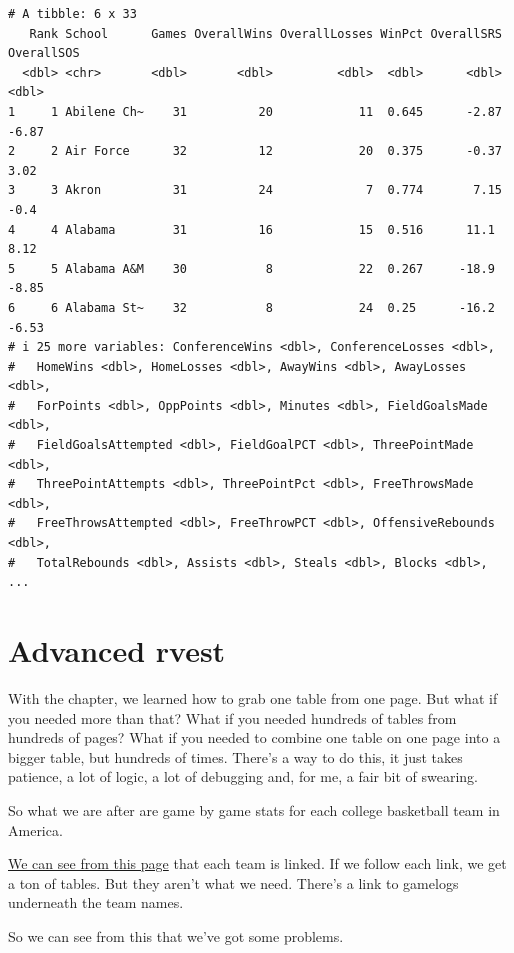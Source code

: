 \documentclass[
  letterpaper,
  DIV=11,
  numbers=noendperiod]{scrreprt}
\begin{document}
\begin{verbatim}
# A tibble: 6 x 33
   Rank School      Games OverallWins OverallLosses WinPct OverallSRS OverallSOS
  <dbl> <chr>       <dbl>       <dbl>         <dbl>  <dbl>      <dbl>      <dbl>
1     1 Abilene Ch~    31          20            11  0.645      -2.87      -6.87
2     2 Air Force      32          12            20  0.375      -0.37       3.02
3     3 Akron          31          24             7  0.774       7.15      -0.4 
4     4 Alabama        31          16            15  0.516      11.1        8.12
5     5 Alabama A&M    30           8            22  0.267     -18.9       -8.85
6     6 Alabama St~    32           8            24  0.25      -16.2       -6.53
# i 25 more variables: ConferenceWins <dbl>, ConferenceLosses <dbl>,
#   HomeWins <dbl>, HomeLosses <dbl>, AwayWins <dbl>, AwayLosses <dbl>,
#   ForPoints <dbl>, OppPoints <dbl>, Minutes <dbl>, FieldGoalsMade <dbl>,
#   FieldGoalsAttempted <dbl>, FieldGoalPCT <dbl>, ThreePointMade <dbl>,
#   ThreePointAttempts <dbl>, ThreePointPct <dbl>, FreeThrowsMade <dbl>,
#   FreeThrowsAttempted <dbl>, FreeThrowPCT <dbl>, OffensiveRebounds <dbl>,
#   TotalRebounds <dbl>, Assists <dbl>, Steals <dbl>, Blocks <dbl>, ...
\end{verbatim}


\hypertarget{advanced-rvest}{%
\chapter{Advanced rvest}\label{advanced-rvest}}

With the chapter, we learned how to grab one table from one page. But
what if you needed more than that? What if you needed hundreds of tables
from hundreds of pages? What if you needed to combine one table on one
page into a bigger table, but hundreds of times. There's a way to do
this, it just takes patience, a lot of logic, a lot of debugging and,
for me, a fair bit of swearing.

So what we are after are game by game stats for each college basketball
team in America.

\href{https://www.sports-reference.com/cbb/seasons/2019-school-stats.html}{We
can see from this page} that each team is linked. If we follow each
link, we get a ton of tables. But they aren't what we need. There's a
link to gamelogs underneath the team names.

So we can see from this that we've got some problems.
\end{document}
